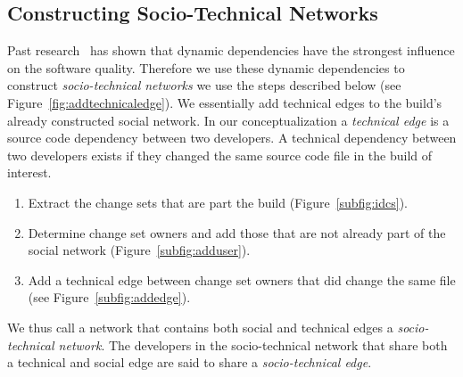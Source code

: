 \subsection{Constructing Socio-Technical Networks}
\label{subsec:technical}
Past research~\cite{nagappan:icse:2005} has shown that dynamic dependencies have the strongest influence on the software quality.
Therefore we use these dynamic dependencies
to construct \emph{socio-technical networks} we use the steps described below
(see Figure~\ref{fig:addtechnicaledge}). We essentially add technical edges to
the build's already constructed social network. In our conceptualization a \emph{technical edge} is a source code
dependency between two developers. A technical dependency between two developers
exists if they changed the same source code file in the build of interest. 

\begin{enumerate}
\item Extract the change sets that are part the build (Figure~\ref{subfig:idcs}).
\item Determine change set owners and add those  that are not already part
of the social network (Figure~\ref{subfig:adduser}).
\item Add a technical edge between change set owners that did change the same file (see Figure~\ref{subfig:addedge}).
\end{enumerate}


We thus call a network that contains both social and technical edges a
\emph{socio-technical network}. The developers in the 
socio-technical network that share both a technical and social edge are said to share
a \emph{socio-technical edge}.











